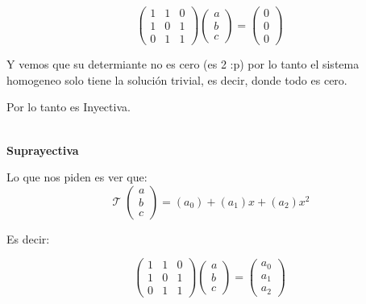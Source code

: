 \documentclass[12pt]{report}                                %
\DeclareMathOperator \LinealTransformation {\mathcal{T}}
\begin{document}
            \begin{equation*}
            \begin{pmatrix}1&1&0\\1&0&1\\0&1&1\end{pmatrix}
                \begin{pmatrix}a\\b\\c\end{pmatrix}=
                \begin{pmatrix}0\\0\\0\end{pmatrix}
            \end{equation*}

            Y vemos que su determiante no es cero (es 2 :p) por lo tanto el sistema homogeneo solo
            tiene la solución trivial, es decir, donde todo es cero.

            Por lo tanto es Inyectiva.

            \textbf{\\Suprayectiva}

            Lo que nos piden es ver que:
            \begin{equation*}
                \LinealTransformation(\begin{matrix}a\\b\\c\end{matrix}) = (a_0) +(a_1)x+(a_2)x^2
            \end{equation*}

            Es decir:

            \begin{equation*}
                \begin{pmatrix}1&1&0\\1&0&1\\0&1&1\end{pmatrix}
                \begin{pmatrix}a\\b\\c\end{pmatrix}
                =
                \begin{pmatrix}a_0\\a_1\\a_2\end{pmatrix}
            \end{equation*}
\end{document}
